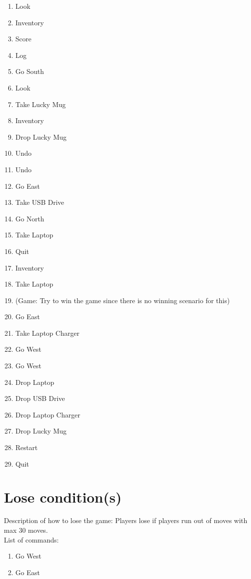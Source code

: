 \documentclass[11pt]{article}
\begin{document}
\begin{enumerate}
    \item Look
    \item Inventory
    \item Score
    \item Log

    \item Go South
    \item Look
    \item Take Lucky Mug
    \item Inventory
    \item Drop Lucky Mug
    \item Undo
    \item Undo

    \item Go East
    \item Take USB Drive
    \item Go North
    \item Take Laptop
    \item Quit
    \item Inventory

    \item Take Laptop
    \item (Game: Try to win the game since there is no winning scenario for this)
    \item Go East
    \item Take Laptop Charger
    \item Go West
    \item Go West

    \item Drop Laptop
    \item Drop USB Drive
    \item Drop Laptop Charger
    \item Drop Lucky Mug

    \item Restart
    \item Quit
\end{enumerate}


\section*{Lose condition(s)}
Description of how to lose the game: Players lose if players run out of moves with max 30 moves.\\

List of commands:
    \begin{enumerate}
        \item Go West
        \item Go East
    \end{enumerate}
\end{document}

